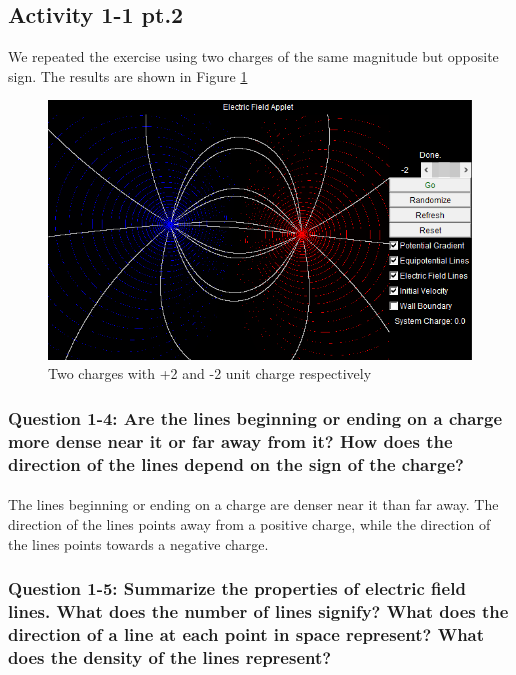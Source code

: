 \documentclass[oneside,12pt]{amsart}
\begin{document}
\subsection{Activity 1-1 pt.2}We repeated the exercise using two charges of the same magnitude but opposite sign. The results are shown in Figure \ref{PosNeg}

\begin{figure}[H]
	\includegraphics[width=\medgraph,scale=0.01]{PosNeg.png}
	\caption{ Two charges with +2 and -2 unit charge respectively } 
	\label{PosNeg}
\end{figure}

 
\subsubsection{ Question 1-4: Are the lines beginning or ending on a charge more dense near it or far away from it? How does the direction of the lines depend on the sign of the charge?}
\paragraph{}
\indent The lines beginning or ending on a charge are denser near it than far away. The direction of the lines points away from a positive charge, while the direction of the lines points towards a negative charge.

\subsubsection{Question 1-5: Summarize the properties of electric field lines. What does the number of lines signify? What does the direction of a line at each point in space represent? What does the density of the lines represent?
}
\end{document}
